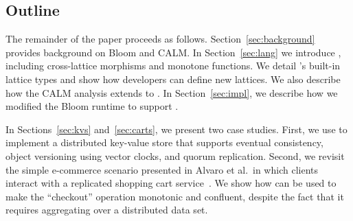 % 

\subsection{Outline}
The remainder of the paper proceeds as follows.  Section~\ref{sec:background}
provides background on Bloom and CALM.  In Section~\ref{sec:lang} we introduce
\lang, including cross-lattice morphisms and monotone functions. We detail
\lang's built-in lattice types and show how developers can define new lattices.
We also describe how the CALM analysis extends to \lang.  In
Section~\ref{sec:impl}, we describe how we modified the Bloom runtime to support
\lang.

In Sections~\ref{sec:kvs} and~\ref{sec:carts}, we present two case studies.
First, we use \lang to implement a distributed key-value store that supports
eventual consistency, object versioning using vector clocks, and quorum
replication. Second, we revisit the simple e-commerce scenario presented in
Alvaro et al.\ in which clients interact with a replicated shopping cart
service~\cite{Alvaro2011}. We show how \lang can be used to make the
``checkout'' operation monotonic and confluent, despite the fact that it
requires aggregating over a distributed data set.

